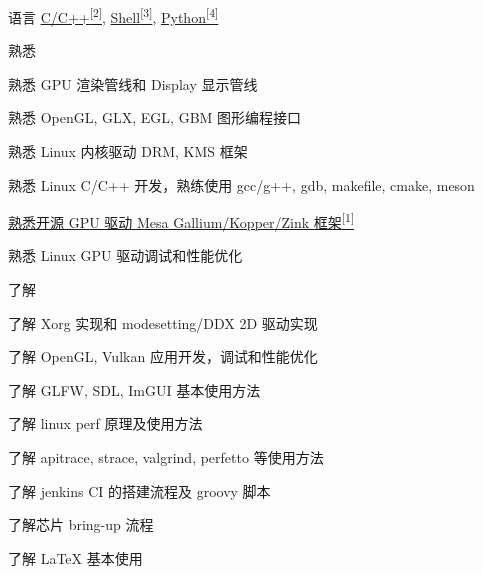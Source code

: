 
\begin{cvskills}
  \cvskill
    {语言} %
    {\hyperlink{cpp-proj}{C/C++\textsuperscript{[2]}}, \hyperlink{shell-proj}{Shell\textsuperscript{[3]}}, \hyperlink{python-proj}{Python\textsuperscript{[4]}}} %
\end{cvskills}

\begin{cventries}
  \cventry
    {} %
    {熟悉} %
    {} %
    {} %
    {
      \begin{cvitems} %
        \item {熟悉 GPU 渲染管线和 Display 显示管线}
        \item {熟悉 OpenGL, GLX, EGL, GBM 图形编程接口}
        \item {熟悉 Linux 内核驱动 DRM, KMS 框架}
        \item {熟悉 Linux C/C++ 开发，熟练使用 gcc/g++, gdb, makefile, cmake, meson}
        \item {\hyperlink{mesa-mr}{熟悉开源 GPU 驱动 Mesa Gallium/Kopper/Zink 框架\textsuperscript{[1]}}}
        \item {熟悉 Linux GPU 驱动调试和性能优化}
      \end{cvitems}
    }
  \cventry
    {} %
    {了解} %
    {} %
    {} %
    {
      \begin{cvitems} %
        \item {了解 Xorg 实现和 modesetting/DDX 2D 驱动实现}
        \item {了解 OpenGL, Vulkan 应用开发，调试和性能优化}
        \item {了解 GLFW, SDL, ImGUI 基本使用方法}
        \item {了解 linux perf 原理及使用方法}
        \item {了解 apitrace, strace, valgrind, perfetto 等使用方法}
        \item {了解 jenkins CI 的搭建流程及 groovy 脚本}
        \item {了解芯片 bring-up 流程}
        \item {了解 LaTeX 基本使用}
      \end{cvitems}
    }
\end{cventries}
